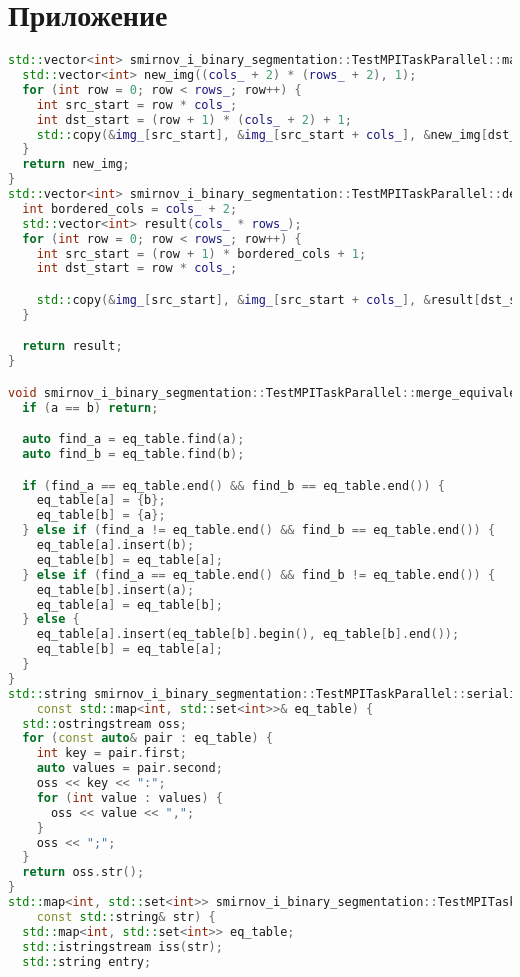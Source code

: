 \documentclass[a4paper,12pt]{article}
\begin{document}
\section{Приложение}
\begin{lstlisting}[language=C++,caption={Фрагмент MPI-версии}]
std::vector<int> smirnov_i_binary_segmentation::TestMPITaskParallel::make_border(const std::vector<int>& img_,int cols_, int rows_) {
  std::vector<int> new_img((cols_ + 2) * (rows_ + 2), 1);
  for (int row = 0; row < rows_; row++) {
    int src_start = row * cols_;
    int dst_start = (row + 1) * (cols_ + 2) + 1;
    std::copy(&img_[src_start], &img_[src_start + cols_], &new_img[dst_start]);
  }
  return new_img;
}
std::vector<int> smirnov_i_binary_segmentation::TestMPITaskParallel::del_border(const std::vector<int>& img_, int cols_, int rows_) {
  int bordered_cols = cols_ + 2;
  std::vector<int> result(cols_ * rows_);
  for (int row = 0; row < rows_; row++) {
    int src_start = (row + 1) * bordered_cols + 1;
    int dst_start = row * cols_;

    std::copy(&img_[src_start], &img_[src_start + cols_], &result[dst_start]);
  }

  return result;
}

void smirnov_i_binary_segmentation::TestMPITaskParallel::merge_equivalence(std::map<int, std::set<int>>& eq_table, int a, int b) {
  if (a == b) return;

  auto find_a = eq_table.find(a);
  auto find_b = eq_table.find(b);

  if (find_a == eq_table.end() && find_b == eq_table.end()) {
    eq_table[a] = {b};
    eq_table[b] = {a};
  } else if (find_a != eq_table.end() && find_b == eq_table.end()) {
    eq_table[a].insert(b);
    eq_table[b] = eq_table[a];
  } else if (find_a == eq_table.end() && find_b != eq_table.end()) {
    eq_table[b].insert(a);
    eq_table[a] = eq_table[b];
  } else {
    eq_table[a].insert(eq_table[b].begin(), eq_table[b].end());
    eq_table[b] = eq_table[a];
  }
}
std::string smirnov_i_binary_segmentation::TestMPITaskParallel::serialize_eq_table(
    const std::map<int, std::set<int>>& eq_table) {
  std::ostringstream oss;
  for (const auto& pair : eq_table) {
    int key = pair.first;
    auto values = pair.second;
    oss << key << ":";
    for (int value : values) {
      oss << value << ",";
    }
    oss << ";";
  }
  return oss.str();
}
std::map<int, std::set<int>> smirnov_i_binary_segmentation::TestMPITaskParallel::deserialize_eq_table(
    const std::string& str) {
  std::map<int, std::set<int>> eq_table;
  std::istringstream iss(str);
  std::string entry;


\end{lstlisting}
\end{document}
